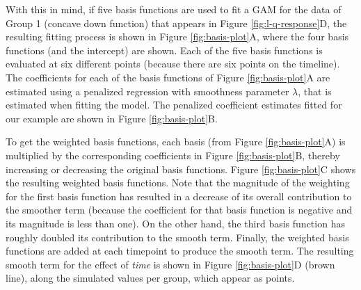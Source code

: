 \documentclass[
]{article}
\begin{document}
With this in mind, if five basis functions are used to fit a GAM for the data of Group 1 (concave down function) that appears in Figure \ref{fig:l-q-response}D, the resulting fitting process is shown in Figure \ref{fig:basis-plot}A, where the four basis functions (and the intercept) are shown. Each of the five basis functions is evaluated at six different points (because there are six points on the timeline). The coefficients for each of the basis functions of Figure \ref{fig:basis-plot}A are estimated using a penalized regression with smoothness parameter \(\lambda\), that is estimated when fitting the model. The penalized coefficient estimates fitted for our example are shown in Figure \ref{fig:basis-plot}B.

To get the weighted basis functions, each basis (from Figure \ref{fig:basis-plot}A) is multiplied by the corresponding coefficients in Figure \ref{fig:basis-plot}B, thereby increasing or decreasing the original basis functions. Figure \ref{fig:basis-plot}C shows the resulting weighted basis functions. Note that the magnitude of the weighting for the first basis function has resulted in a decrease of its overall contribution to the smoother term (because the coefficient for that basis function is negative and its magnitude is less than one). On the other hand, the third basis function has roughly doubled its contribution to the smooth term. Finally, the weighted basis functions are added at each timepoint to produce the smooth term. The resulting smooth term for the effect of \emph{time} is shown in Figure \ref{fig:basis-plot}D (brown line), along the simulated values per group, which appear as points.
\end{document}
